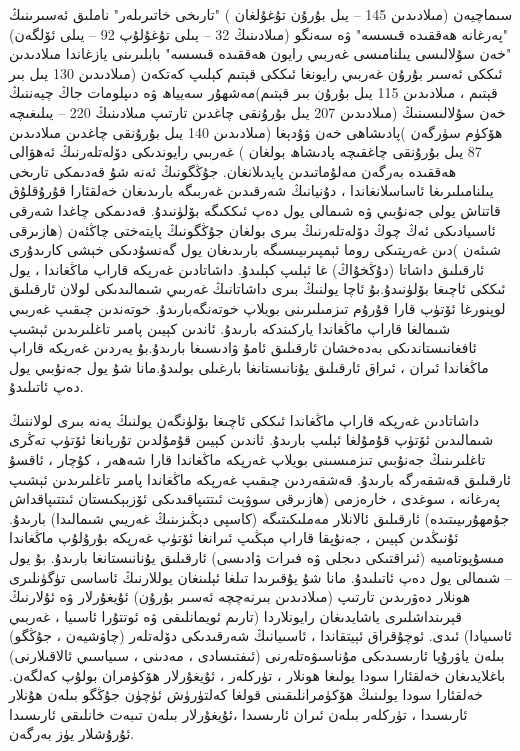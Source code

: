 \documentclass[a4paper]{article}
\begin{document}
سىماچيەن (مىلادىدىن 145 – يىل بۇرۇن تۇغۇلغان ) "تارىخى خاتىرىلەر" ناملىق ئەسىرىنىڭ "پەرغانە ھەققىدە قىسسە" ۋە سەنگو (مىلادىنىڭ 32 – يىلى تۇغۇلۇپ 92 – يىلى ئۆلگەن) "خەن سۇلالىسى يىلنامىسى غەربىي رايون ھەققىدە قىسسە" بابلىرىنى يازغاندا مىلادىدىن ئىككى ئەسىر بۇرۇن غەربىي رايونغا ئىككى قېتىم كېلىپ كەتكەن (مىلادىدىن 130 يىل بىر قېتىم ، مىلادىدىن 115 يىل بۇرۇن بىر قېتىم)مەشھۇر سەيياھ ۋە دىپلومات جاڭ چيەننىڭ خەن سۇلالىسىنىڭ (مىلادىدىن 207 يىل بۇرۇنقى چاغدىن تارتىپ مىلادىنىڭ 220 – يىلىغىچە ھۆكۈم سۈرگەن )پادىشاھى خەن ۋۇدېغا (مىلادىدىن 140 يىل بۇرۇنقى چاغدىن مىلادىدىن 87 يىل بۇرۇنقى چاغقىچە پادىشاھ بولغان ) غەربىي رايوندىكى دۆلەتلەرنىڭ ئەھۋالى ھەققىدە بەرگەن مەلۇماتىدىن پايدىلانغان. جۇڭگونىڭ ئەنە شۇ قەدىمكى تارىخى يىلنامىلىرىغا ئاساسلانغاندا ، دۇنيانىڭ شەرقىدىن غەربىگە بارىدىغان خەلقئارا قۇرۇقلۇق قاتناش يولى جەنۇبىي ۋە شىمالى يول دەپ ئىككىگە بۆلۈنىدۇ. قەدىمكى چاغدا شەرقى ئاسىيادىكى ئەڭ چوڭ دۆلەتلەرنىڭ بىرى بولغان جۇڭگونىڭ پايتەختى چاڭئەن (ھازىرقى شىئەن )دىن غەرپتىكى روما ئېمپىرىيىسىگە بارىدىغان يول گەنسۇدىكى خېشى كارىدۇرى ئارقىلىق داشاتا (دۇڭخۇاڭ) غا ئېلىپ كېلىدۇ. داشاتادىن غەرپكە قاراپ ماڭغاندا ، يول ئىككى ئاچىغا بۆلۈنىدۇ.بۇ ئاچا يولنىڭ بىرى داشاتانىڭ غەربىي شىمالىدىكى لولان ئارقىلىق لوپنورغا ئۆتۈپ قارا قۇرۇم تىزمىلىرىنى بويلاپ خوتەنگەبارىدۇ. خوتەندىن چىقىپ غەربىي شىمالغا قاراپ ماڭغاندا ياركىندكە بارىدۇ. ئاندىن كېيىن پامىر تاغلىرىدىن ئېشىپ ئافغانىستاندىكى بەدەخشان ئارقىلىق ئامۇ ۋادىسىغا بارىدۇ.بۇ يەردىن غەرپكە قاراپ ماڭغاندا ئىران ، ئىراق ئارقىلىق يۇنانىستانغا بارغىلى بولىدۇ.مانا شۇ يول جەنۇبىي يول دەپ ئاتىلىدۇ.



داشاتادىن غەرپكە قاراپ ماڭغاندا ئىككى ئاچىغا بۆلۈنگەن يولنىڭ يەنە بىرى لولاننىڭ شىمالىدىن ئۆتۈپ قۇمۇلغا ئېلىپ بارىدۇ. ئاندىن كېيىن قۇمۇلدىن تۇرپانغا ئۆتۈپ تەڭرى تاغلىرىنىڭ جەنۇبىي تىزمىسىنى بويلاپ غەرپكە ماڭغاندا قارا شەھەر ، كۇچار ، ئاقسۇ ئارقىلىق قەشقەرگە بارىدۇ. قەشقەردىن چىقىپ غەرپكە ماڭغاندا پامىر تاغلىرىدىن ئېشىپ پەرغانە ، سوغدى ، خارەزمى (ھازىرقى سوۋېت ئىتتىپاقىدىكى ئۆزبېكىستان ئىتتىپاقداش جۇمھۇرىيىتىدە) ئارقىلىق ئالانلار مەملىكىتىگە (كاسپى دېڭىزىنىڭ غەريىي شىمالىدا) بارىدۇ. ئۇنىڭدىن كېيىن ، جەنۇپقا قاراپ مېڭىپ ئىرانغا ئۆتۈپ غەرپكە بۇرۇلۇپ ماڭغاندا مىسۇپوتامىيە (ئىراقتىكى دىجلى ۋە فىرات ۋادىسى) ئارقىلىق يۇنانىستانغا بارىدۇ. بۇ يول – شىمالى يول دەپ ئاتىلىدۇ. مانا شۇ يۇقىرىدا تىلغا ئېلىنغان يوللارنىڭ ئاساسى تۈگۈنلىرى ھونلار دەۋرىدىن تارتىپ (مىلادىدىن بىرنەچچە ئەسىر بۇرۇن) ئۇيغۇرلار ۋە ئۇلارنىڭ قېرىنداشلىرى ياشايدىغان رايونلاردا (تارىم ئويمانلىقى ۋە ئوتتۇرا ئاسىيا ، غەربىي ئاسىيادا) ئىدى. ئوچۇقراق ئېيتقاندا ، ئاسىيانىڭ شەرقىدىكى دۆلەتلەر (چاۋشيەن ، جۇڭگو) بىلەن ياۋرۇپا ئارىسىدىكى مۇناسىۋەتلەرنى (ئىفتىسادى ، مەدىنى ، سىياسىي ئالاقىلارنى) باغلايدىغان خەلقئارا سودا يولىغا ھونلار ، تۈركلەر ، ئۇيغۇرلار ھۆكۈمران بولۇپ كەلگەن. خەلقئارا سودا يولىنىڭ ھۆكۈمرانلىقىنى قولغا كەلتۈرۈش ئۈچۈن جۇڭگو بىلەن ھۇنلار ئارىسىدا ، تۈركلەر بىلەن ئىران ئارىسىدا ،ئۇيغۇرلار بىلەن تىبەت خانلىقى ئارىسىدا ئۇرۇشلار يۈز بەرگەن.
\end{document}
